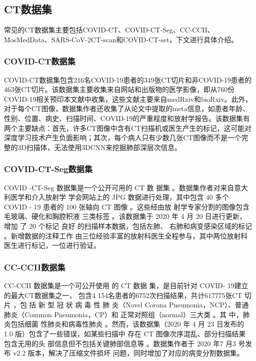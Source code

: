 \documentclass[journal,twoside,web]{ieeecolor}
\begin{document}
\subsection{CT数据集}
常见的CT数据集主要包括COVID-CT、COVID-CT-Seg、CC-CCII、MosMedData、SARS-CoV-2CT-scan和COVID-CT-set，下文进行具体介绍。
\subsubsection{COVID-CT数据集}
COVID-CT数据集包含216名COVID-19患者的349张CT切片和非COVID-19患者的463张CT切片。该数据集主要收集来自网站和出版物的医学影像，即从760份COVID-19相关预印本文献中收集，这些文献主要来自medRxiv和bioRxiv。此外，对于每个CT图像，数据集作者还收集了从论文中提取的meta信息，如患者年龄、性别、位置、病史、扫描时间、COVID-19的严重程度和放射学报告。该数据集有两个主要缺点：首先，许多CT图像中含有CT扫描机或医生产生的标记，这可能对深度学习技术产生负面影响；其次，每个病人只有少数几张CT图像而不是一个完整的3D扫描体，无法使用3DCNN来挖掘肺部深层次信息。
\subsubsection{COVID-CT-Seg数据集}
COVID -CT-Seg 数据集是一个公开可用的 CT 数  据集 。数据集作者对来自意大利医学和介入放射学  学会网站上的 JPG 数据进行处理，其中包含 40 多个  COVID - 19 患者的 100 张轴向 CT 图像 。这些经由放  射学专家分割的图像包含毛玻璃、硬化和胸腔积液  三类标签 。该数据集于 2020 年 4 月 20 日进行更新， 增加 了 20 个标记 良好 的扫描样本数据，包括左肺、 右肺和病变感染区域的标记 。新增数据的注释工作  由三位经验丰富的放射科医生全程参与，其中两位放射科医生进行标记，一位进行验证。
\subsubsection{CC-CCII数据集}
CC-CCII 数据集是一个可公开使用 的 CT 数据 集，是目前针对 COVID- 19建立的最大CT数据集之一， 包含4 154名患者的6752次扫描结果，共计617775张CT  切 片 ，包 括 新 型 冠 状 病 毒 性 肺 炎（Novel  Corona  Pneumonia，NCP）、普通肺炎（Common Pneumonia，CP）和 正常对照组（normal）三大类 。其 中，肺炎包括细菌 性肺炎和病毒性肺炎 。然而，该数据集（2020 年 4 月 23 日发布的 1.0 版）包含了一些错误，如某些扫描中 存在 CT 图像次序混乱、部分扫描结果包含无用的头 部信息但不包括关键肺部信息等 。数据集作者于 2020 年7 月3 号发布 v2.2 版本，解决了压缩文件损坏 问题，同时增加了对应的病变分割数据集。
\end{document}
